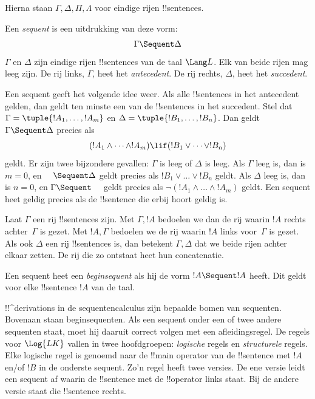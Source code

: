 \documentclass[../../../include/open-logic-section]{subfiles}
\begin{document}
      {}
      {}


Hierna staan $\Gamma, \Delta, \Pi, \Lambda$ voor eindige rijen
!!{sentence}s.

\begin{defn}[Sequent]
Een \emph{sequent} is een uitdrukking van deze vorm:
\[
\Gamma \Sequent \Delta
\]
$\Gamma$ en $\Delta$ zijn eindige rijen !!{sentence}s van de taal
$\Lang L$. Elk van beide rijen mag leeg zijn. De rij links,
$\Gamma$, heet het \emph{antecedent}. De rij rechts, $\Delta$, heet het
\emph{succedent}.
\end{defn}

\begin{explain}
Een sequent geeft het volgende idee weer. Als alle !!{sentence}s in het
antecedent gelden, dan geldt ten minste een van de !!{sentence}s in het
succedent. Stel dat $\Gamma = \tuple{!A_1, \dots, !A_m}$ en $\Delta =
\tuple{!B_1, \dots, !B_n}$. Dan geldt $\Gamma \Sequent \Delta$ precies
als
\[
(!A_1 \land \cdots \land !A_m) \lif (!B_1 \lor \cdots \lor
!B_n)
\]
geldt. Er zijn twee bijzondere gevallen: $\Gamma$ is leeg of $\Delta$
is leeg. Als $\Gamma$ leeg is, dan is $m = 0$, en $\quad \Sequent
\Delta$ geldt precies als $!B_1 \lor \dots \lor !B_n$ geldt. Als
$\Delta$ leeg is, dan is $n = 0$, en $\Gamma \Sequent \quad$ geldt
precies als $\lnot(!A_1 \land \dots \land !A_m)$ geldt. Een sequent heet
geldig precies als de !!{sentence} die erbij hoort geldig is.
\end{explain}

Laat $\Gamma$ een rij !!{sentence}s zijn. Met $\Gamma, !A$ bedoelen we
dan de rij waarin $!A$ rechts achter~$\Gamma$ is gezet. Met $!A,
\Gamma$ bedoelen we de rij waarin $!A$ links voor~$\Gamma$ is gezet.
Als ook $\Delta$ een rij !!{sentence}s is, dan betekent $\Gamma,
\Delta$ dat we beide rijen achter elkaar zetten. De rij die zo ontstaat
heet hun concatenatie.

\begin{defn}[Beginsequent]
Een sequent heet een \emph{beginsequent} als hij
{de vorm $!A \Sequent !A$ heeft}. Dit geldt voor elke !!{sentence} $!A$
van de taal.
\end{defn}

!!^{derivation}s in de sequentencalculus zijn bepaalde bomen van
sequenten. Bovenaan staan beginsequenten. Als een sequent onder een of
twee andere sequenten staat, moet hij daaruit correct volgen met een
afleidingsregel. De regels voor $\Log{LK}$ vallen in twee hoofdgroepen:
\emph{logische} regels en \emph{structurele} regels. Elke logische regel
is genoemd naar de !!{main operator} van de !!{sentence} met $!A$
en/of $!B$ in de onderste sequent. Zo'n regel heeft twee versies. De
ene versie leidt een sequent af waarin de !!{sentence} met de
!!{operator} links staat. Bij de andere versie staat die !!{sentence}
rechts.
\end{document}
